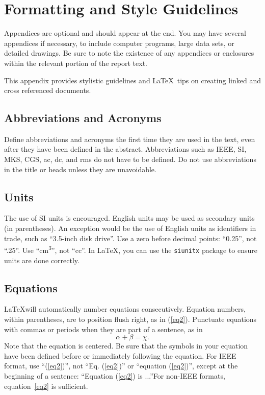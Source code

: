 \documentclass{wrcecapstone}
\begin{document}
\clearpage
\appendix
\section{Formatting and Style Guidelines}\label{app-style}
Appendices are optional and should appear at the end. You may have several appendices if necessary, to include computer programs, large data sets, or detailed drawings. Be sure to note the existence of any appendices or enclosures within the relevant portion of the report text.  

This appendix provides stylistic guidelines and \LaTeX\ tips on creating linked and cross referenced documents.  

\subsection{Abbreviations and Acronyms}
Define abbreviations and acronyms the first time they are used in the text, even after they have been defined in the abstract. Abbreviations such as IEEE, SI, MKS, CGS, ac, dc, and rms do not have to be defined. Do not use abbreviations in the title or heads unless they are unavoidable.

\subsection{Units}
The use of SI units is encouraged. English units may be used as secondary units (in parentheses). An exception would be the use of English units as identifiers in trade, such as ``3.5-inch disk drive''. Use a zero before decimal points: ``0.25'', not ``.25''. Use ``\si{\centi\meter\cubed}'', not ``cc''. In \LaTeX, you can use the \lstinline{siunitx} package to ensure units are done correctly. 

\subsection{Equations}
\LaTeX will automatically number equations consecutively. Equation numbers, within parentheses, are to position flush right, as in (\ref{eq2}). Punctuate equations with commas or periods when they are part of a sentence, as in
\begin{equation}
\alpha + \beta = \chi.
\label{eq2}
\end{equation}
Note that the equation is centered. Be sure that the symbols in your equation have been defined before or immediately following the equation. For IEEE format, use ``(\ref{eq2})'', not ``Eq. (\ref{eq2})'' or ``equation (\ref{eq2})'', except at the beginning of a sentence: ``Equation (\ref{eq2}) is ...''For non-IEEE formats, equation~\ref{eq2} is sufficient. 
\end{document}
